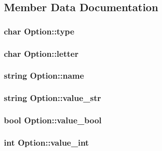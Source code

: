 \subsection{Member Data Documentation}
\hypertarget{struct_option_a08dcf2742c8429087baaacf694089cbe}{
\subsubsection[{type}]{\setlength{\rightskip}{0pt plus 5cm}char Option\-::type}}\label{struct_option_a08dcf2742c8429087baaacf694089cbe}
\hypertarget{struct_option_add92e993875c6dfd378c51418d253e84}{
\subsubsection[{letter}]{\setlength{\rightskip}{0pt plus 5cm}char Option\-::letter}}\label{struct_option_add92e993875c6dfd378c51418d253e84}
\hypertarget{struct_option_a2a2fd32b8112451bdfd96322c098b6a3}{
\subsubsection[{name}]{\setlength{\rightskip}{0pt plus 5cm}string Option\-::name}}\label{struct_option_a2a2fd32b8112451bdfd96322c098b6a3}
\hypertarget{struct_option_a3f52e913f047b38e95b1490d76eeff00}{
\subsubsection[{value\-\_\-str}]{\setlength{\rightskip}{0pt plus 5cm}string Option\-::value\-\_\-str}}\label{struct_option_a3f52e913f047b38e95b1490d76eeff00}
\hypertarget{struct_option_adfda258d1ec248be6deb65763cceaa07}{
\subsubsection[{value\-\_\-bool}]{\setlength{\rightskip}{0pt plus 5cm}bool Option\-::value\-\_\-bool}}\label{struct_option_adfda258d1ec248be6deb65763cceaa07}
\hypertarget{struct_option_a186e1e38cbb463db97e6ac0bd9df2c7f}{
\subsubsection[{value\-\_\-int}]{\setlength{\rightskip}{0pt plus 5cm}int Option\-::value\-\_\-int}}\label{struct_option_a186e1e38cbb463db97e6ac0bd9df2c7f}
